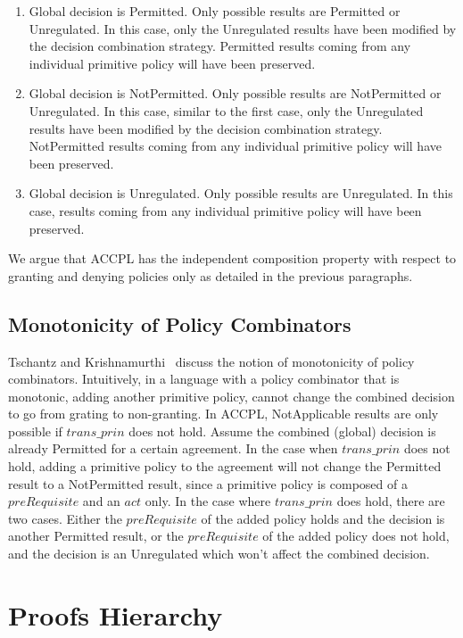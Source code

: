 \begin{enumerate}
  \item Global decision is Permitted. Only possible results are Permitted or Unregulated. In this case, only the Unregulated results have been modified by the decision combination strategy. Permitted results coming from any individual primitive policy will have been preserved.
  \item Global decision is NotPermitted. Only possible results are NotPermitted or Unregulated. In this case, similar to the first case, only the Unregulated results have been modified by the decision combination strategy. NotPermitted results coming from any individual primitive policy will have been preserved.
   \item Global decision is Unregulated. Only possible results are Unregulated.  In this case, results coming from any individual primitive policy will have been preserved.
\end{enumerate}

We argue that \ac{ACCPL} has the independent composition property with respect to granting and denying policies only as detailed in the previous paragraphs. 

\subsection{Monotonicity of Policy Combinators}

Tschantz and Krishnamurthi~\cite{Tschantz} discuss the notion of monotonicity of policy combinators. Intuitively, in a language with a policy combinator that is monotonic, adding another primitive policy, cannot change the combined decision to go from grating to non-granting. In \ac{ACCPL}, NotApplicable results are only possible if $trans\_prin$ does not hold. Assume the combined (global) decision is already Permitted for a certain agreement. In the case when $trans\_prin$ does not hold, adding a primitive policy to the agreement will not change the Permitted result to a NotPermitted result, since a primitive policy is composed of a $preRequisite$ and an $act$ only. In the case where $trans\_prin$ does hold, there are two cases. Either the $preRequisite$ of the added policy holds and the decision is another Permitted result, or the $preRequisite$ of the added policy does not hold, and the decision is an Unregulated which won't affect the combined decision.





\section{Proofs Hierarchy}\label{sec:intermediatetheorems}

